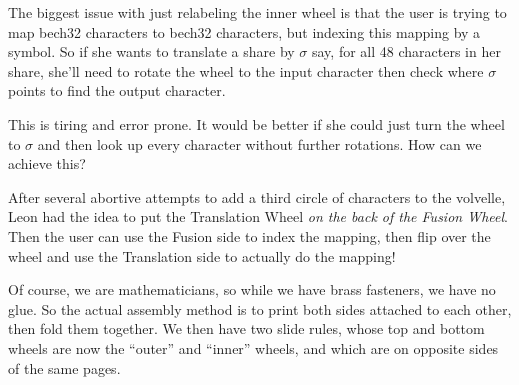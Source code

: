\documentclass[letterpaper]{article}
\begin{document}
The biggest issue with just relabeling the inner wheel is that the user is
trying to map bech32 characters to bech32 characters, but indexing this mapping by
a symbol. So if she wants to translate a share by $\sigma$ say, for all 48
characters in her share, she'll need to rotate the wheel to the input
character then check where $\sigma$ points to find the output character.

This is tiring and error prone.
It would be better if she could just turn the wheel to $\sigma$ and then look
up every character without further rotations. How can we achieve this?

After several abortive attempts to add a third circle of characters to the
volvelle, Leon had the idea to put the Translation Wheel \emph{on the back of the
Fusion Wheel}. Then the user can use the Fusion side to index the mapping, then
flip over the wheel and use the Translation side to actually do the mapping!

Of course, we are mathematicians, so while we have brass fasteners, we have
no glue. So the actual assembly method is to print both sides attached to
each other, then fold them together. We then have two slide rules, whose
top and bottom wheels are now the ``outer'' and ``inner'' wheels, and which
are on opposite sides of the same pages.
\end{document}
